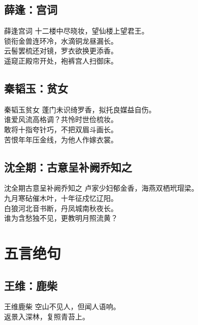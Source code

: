 \documentclass[12pt,oneside,a5paper]{book}
\begin{document}
\chapter{薛逢：宫词}
\begin{poemzh}{薛逢}{宫词}
十二楼中尽晓妆，望仙楼上望君王。\\
锁衔金兽连环冷，水滴铜龙昼漏长。\\
云髻罢梳还对镜，罗衣欲换更添香。\\
遥窥正殿帘开处，袍裤宫人扫御床。\\ 
\end{poemzh}

\chapter{秦韬玉：贫女}
\begin{poemzh}{秦韬玉}{贫女}
蓬门未识绮罗香，拟托良媒益自伤。\\
谁爱风流高格调？共怜时世俭梳妆。\\
敢将十指夸针巧，不把双眉斗画长。\\
苦恨年年压金线，为他人作嫁衣裳。\\ 
\end{poemzh}

\chapter{沈全期：古意呈补阙乔知之}
\begin{poemzh}{沈全期}{古意呈补阙乔知之}
卢家少妇郁金香，海燕双栖玳瑁梁。\\
九月寒砧催木叶，十年征戍忆辽阳。\\
白狼河北音书断，丹凤城南秋夜长。\\
谁为含愁独不见，更教明月照流黄？\\ 
\end{poemzh}


\part{五言绝句}
\chapter{王维：鹿柴}
\begin{poemzh}{王维}{鹿柴}
空山不见人，但闻人语响。\\
返景入深林，复照青苔上。\\ 
\end{poemzh}
\end{document}

